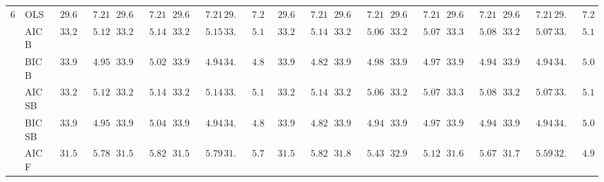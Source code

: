 \begin{tabular}{ll|ll|llllll|llllll|llllll}
6 & OLS  & $\phantom{0}29.67$ & $\phantom{00}7.21$ & $\phantom{0}29.67$ & $\phantom{00}7.21$ & $\phantom{0}29.67$ & $\phantom{00}7.21$ & $29.67$ & $\phantom{0}7.21$ & $\phantom{0}29.67$ & $\phantom{00}7.21$ & $\phantom{0}29.67$ & $\phantom{00}7.21$ & $\phantom{0}29.67$ & $\phantom{00}7.21$ & $\phantom{0}29.67$ & $\phantom{00}7.21$ & $\phantom{0}29.67$ & $\phantom{00}7.21$ & $29.67$ & $\phantom{0}7.21$ \\
 & AIC B  & $\phantom{0}33.24$ & $\phantom{00}5.12$ & $\phantom{0}33.28$ & $\phantom{00}5.14$ & $\phantom{0}33.29$ & $\phantom{00}5.15$ & $33.32$ & $\phantom{0}5.11$ & $\phantom{0}33.27$ & $\phantom{00}5.14$ & $\phantom{0}33.27$ & $\phantom{00}5.06$ & $\phantom{0}33.28$ & $\phantom{00}5.07$ & $\phantom{0}33.30$ & $\phantom{00}5.08$ & $\phantom{0}33.26$ & $\phantom{00}5.07$ & $33.26$ & $\phantom{0}5.14$ \\
 & BIC B  & $\phantom{0}33.97$ & $\phantom{00}4.95$ & $\phantom{0}33.94$ & $\phantom{00}5.02$ & $\phantom{0}33.90$ & $\phantom{00}4.94$ & $34.12$ & $\phantom{0}4.88$ & $\phantom{0}33.96$ & $\phantom{00}4.82$ & $\phantom{0}33.96$ & $\phantom{00}4.98$ & $\phantom{0}33.96$ & $\phantom{00}4.97$ & $\phantom{0}33.92$ & $\phantom{00}4.94$ & $\phantom{0}33.91$ & $\phantom{00}4.94$ & $34.11$ & $\phantom{0}5.02$ \\
 & AIC SB  & $\phantom{0}33.24$ & $\phantom{00}5.12$ & $\phantom{0}33.28$ & $\phantom{00}5.14$ & $\phantom{0}33.29$ & $\phantom{00}5.14$ & $33.32$ & $\phantom{0}5.11$ & $\phantom{0}33.27$ & $\phantom{00}5.14$ & $\phantom{0}33.27$ & $\phantom{00}5.06$ & $\phantom{0}33.27$ & $\phantom{00}5.07$ & $\phantom{0}33.30$ & $\phantom{00}5.08$ & $\phantom{0}33.24$ & $\phantom{00}5.07$ & $33.26$ & $\phantom{0}5.14$ \\
 & BIC SB  & $\phantom{0}33.97$ & $\phantom{00}4.95$ & $\phantom{0}33.94$ & $\phantom{00}5.04$ & $\phantom{0}33.90$ & $\phantom{00}4.94$ & $34.12$ & $\phantom{0}4.88$ & $\phantom{0}33.96$ & $\phantom{00}4.82$ & $\phantom{0}33.94$ & $\phantom{00}4.94$ & $\phantom{0}33.96$ & $\phantom{00}4.97$ & $\phantom{0}33.92$ & $\phantom{00}4.94$ & $\phantom{0}33.91$ & $\phantom{00}4.94$ & $34.10$ & $\phantom{0}5.01$ \\
 & AIC F  & $\phantom{0}31.51$ & $\phantom{00}5.78$ & $\phantom{0}31.52$ & $\phantom{00}5.82$ & $\phantom{0}31.54$ & $\phantom{00}5.79$ & $31.61$ & $\phantom{0}5.73$ & $\phantom{0}31.52$ & $\phantom{00}5.82$ & $\phantom{0}31.88$ & $\phantom{00}5.43$ & $\phantom{0}32.97$ & $\phantom{00}5.12$ & $\phantom{0}31.63$ & $\phantom{00}5.67$ & $\phantom{0}31.76$ & $\phantom{00}5.59$ & $32.83$ & $\phantom{0}4.94$ \\

\end{tabular}
